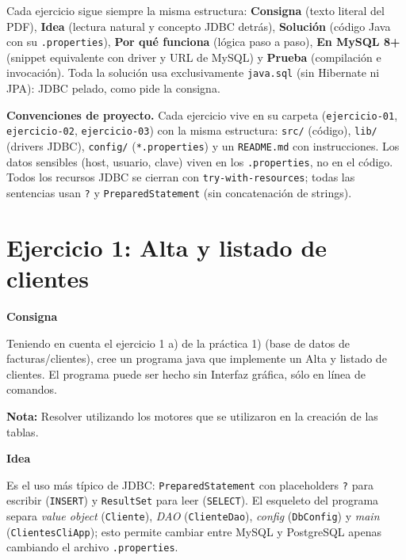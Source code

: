 \documentclass[11pt,a4paper]{article}
\newcommand{\itemcabecera}[1]{\noindent\textbf{#1}\par\medskip}
\newcommand{\bloqueConsigna}{\itemcabecera{Consigna}}
\newcommand{\bloqueIdea}{\itemcabecera{Idea}}
\begin{document}
Cada ejercicio sigue siempre la misma estructura: \textbf{Consigna} (texto literal del PDF), \textbf{Idea} (lectura natural y concepto JDBC detrás), \textbf{Solución} (código Java con su \texttt{.properties}), \textbf{Por qué funciona} (lógica paso a paso), \textbf{En MySQL 8+} (snippet equivalente con driver y URL de MySQL) y \textbf{Prueba} (compilación e invocación). Toda la solución usa exclusivamente \texttt{java.sql} (sin Hibernate ni JPA): JDBC pelado, como pide la consigna.

\begin{nota}
\textbf{Convenciones de proyecto.} Cada ejercicio vive en su carpeta (\texttt{ejercicio-01}, \texttt{ejercicio-02}, \texttt{ejercicio-03}) con la misma estructura: \texttt{src/} (código), \texttt{lib/} (drivers JDBC), \texttt{config/} (\texttt{*.properties}) y un \texttt{README.md} con instrucciones. Los datos sensibles (host, usuario, clave) viven en los \texttt{.properties}, no en el código. Todos los recursos JDBC se cierran con \texttt{try-with-resources}; todas las sentencias usan \texttt{?} y \texttt{PreparedStatement} (sin concatenación de strings).
\end{nota}

\section{Ejercicio 1: Alta y listado de clientes}

\bloqueConsigna

Teniendo en cuenta el ejercicio 1 a) de la práctica 1) (base de datos de facturas/clientes), cree un programa java que implemente un Alta y listado de clientes. El programa puede ser hecho sin Interfaz gráfica, sólo en línea de comandos.

\textbf{Nota:} Resolver utilizando los motores que se utilizaron en la creación de las tablas.

\bloqueIdea

Es el uso más típico de JDBC: \texttt{PreparedStatement} con placeholders \texttt{?} para escribir (\texttt{INSERT}) y \texttt{ResultSet} para leer (\texttt{SELECT}). El esqueleto del programa separa \emph{value object} (\texttt{Cliente}), \emph{DAO} (\texttt{ClienteDao}), \emph{config} (\texttt{DbConfig}) y \emph{main} (\texttt{ClientesCliApp}); esto permite cambiar entre MySQL y PostgreSQL apenas cambiando el archivo \texttt{.properties}.
\end{document}

